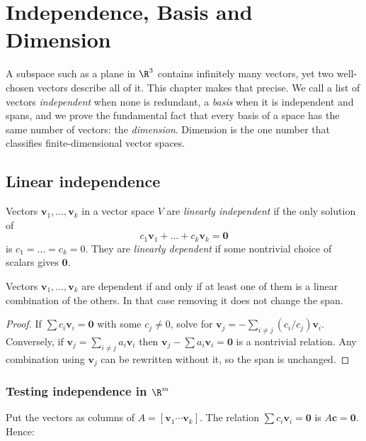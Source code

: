 \chapter{Independence, Basis and Dimension}

A subspace such as a plane in $\R^3$ contains infinitely many vectors, yet two well-chosen vectors describe all of it. This chapter makes that precise. We call a list of vectors \emph{independent} when none is redundant, a \emph{basis} when it is independent and spans, and we prove the fundamental fact that every basis of a space has the same number of vectors: the \emph{dimension}. Dimension is the one number that classifies finite-dimensional vector spaces.

\section{Linear independence}

\begin{definition}
Vectors $\mathbf{v}_1,\dots,\mathbf{v}_k$ in a vector space $V$ are \emph{linearly independent} if the only solution of
\[ c_1\mathbf{v}_1+\dots+c_k\mathbf{v}_k=\mathbf{0} \]
is $c_1=\dots=c_k=0$. They are \emph{linearly dependent} if some nontrivial choice of scalars gives $\mathbf{0}$.
\end{definition}

\begin{proposition}\label{prop:dep}
Vectors $\mathbf{v}_1,\dots,\mathbf{v}_k$ are dependent if and only if at least one of them is a linear combination of the others. In that case removing it does not change the span.
\end{proposition}

\begin{proof}
If $\sum c_i\mathbf{v}_i=\mathbf{0}$ with some $c_j\ne0$, solve for $\mathbf{v}_j=-\sum_{i\ne j}(c_i/c_j)\mathbf{v}_i$. Conversely, if $\mathbf{v}_j=\sum_{i\ne j}a_i\mathbf{v}_i$ then $\mathbf{v}_j-\sum a_i\mathbf{v}_i=\mathbf{0}$ is a nontrivial relation. Any combination using $\mathbf{v}_j$ can be rewritten without it, so the span is unchanged.
\end{proof}

\subsection*{Testing independence in $\R^m$}

Put the vectors as columns of $A=[\mathbf{v}_1\cdots\mathbf{v}_k]$. The relation $\sum c_i\mathbf{v}_i=\mathbf{0}$ is $A\mathbf{c}=\mathbf{0}$. Hence:

